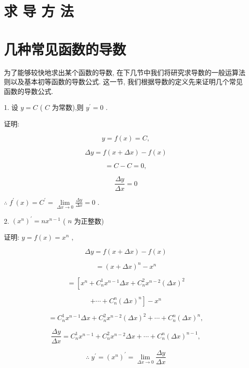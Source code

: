 \documentclass[lang=cn,newtx,12pt,scheme=chinese]{elegantbook}
\begin{document}
\section*{求 导 方 法}

\section{几种常见函数的导数}

为了能够较快地求出某个函数的导数, 在下几节中我们将研究求导数的一般运算法则以及基本初等函数的导数公式. 这一节, 我们根据导数的定义先来证明几个常见函数的导数公式.
\begin{conclusion}
	1. 设 \(y = C\) ( \(C\) 为常数),则 \({y}^{\prime } = 0\) .
\end{conclusion}

证明:

\[
y = f\left( x\right) = C,
\]

\[
{\Delta y} = f\left( {x + {\Delta x}}\right) - f\left( x\right)
\]

\[
= C - C = 0,
\]

\[
\frac{\Delta y}{\Delta x} = 0
\]

\(\therefore \;{f}^{\prime }\left( x\right) = {C}^{\prime } = \mathop{\lim }\limits_{{{\Delta x} \rightarrow 0}}\frac{\Delta y}{\Delta x} = 0\) .

\begin{conclusion}
	2. \({\left( {x}^{n}\right) }^{\prime } = n{x}^{n - 1}\) ( \(n\) 为正整数)
\end{conclusion}

证明: \(y = f\left( x\right) = {x}^{n}\) ,

\[
{\Delta y} = f\left( {x + {\Delta x}}\right) - f\left( x\right)
\]

\[
= {\left( x + \Delta x\right) }^{n} - {x}^{n}
\]

\[
= \left\lbrack {{x}^{n} + {C}_{n}^{1}{x}^{n - 1}{\Delta x} + {C}_{n}^{2}{x}^{n - 2}{\left( \Delta x\right) }^{2}}\right.
\]

\[
\left. {+\cdots + {C}_{n}^{n}{\left( \Delta x\right) }^{n}}\right\rbrack - {x}^{n}
\]

\[
= {C}_{n}^{1}{x}^{n - 1}{\Delta x} + {C}_{n}^{2}{x}^{n - 2}{\left( \Delta x\right) }^{2} + \cdots + {C}_{n}^{n}{\left( \Delta x\right) }^{n},
\]

\[
\frac{\Delta y}{\Delta x} = {C}_{n}^{1}{x}^{n - 1} + {C}_{n}^{2}{x}^{n - 2}{\Delta x} + \cdots + {C}_{n}^{n}{\left( \Delta x\right) }^{n - 1},
\]

\[
\therefore \;{y}^{\prime } = {\left( {x}^{n}\right) }^{\prime } = \mathop{\lim }\limits_{{{\Delta x} \rightarrow 0}}\frac{\Delta y}{\Delta x}
\]
\end{document}
